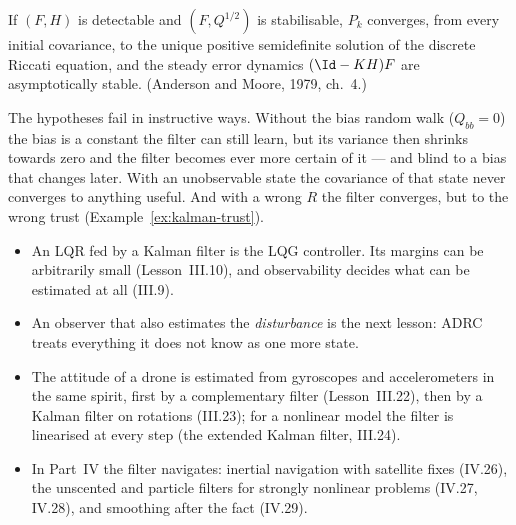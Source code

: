 \begin{theorem}
\label{thm:kalman-steady}
If $(F, H)$ is detectable and $(F, Q^{1/2})$ is stabilisable, $P_k$ converges, from every initial covariance, to the unique positive semidefinite solution of the discrete Riccati equation, and the steady error dynamics $(\Id - KH)F$ are asymptotically stable. (Anderson and Moore, 1979, ch.~4.)
\end{theorem}

The hypotheses fail in instructive ways. Without the bias random walk ($Q_{bb} = 0$) the bias is a constant the filter can still learn, but its variance then shrinks towards zero and the filter becomes ever more certain of it — and blind to a bias that changes later. With an unobservable state the covariance of that state never converges to anything useful. And with a wrong $R$ the filter converges, but to the wrong trust (Example~\ref{ex:kalman-trust}).

\begin{lookahead}
\begin{itemize}[leftmargin=1.2em]
  \item An LQR fed by a Kalman filter is the LQG controller. Its margins can be arbitrarily small (Lesson~III.10), and observability decides what can be estimated at all (III.9).
  \item An observer that also estimates the \emph{disturbance} is the next lesson: ADRC treats everything it does not know as one more state.
  \item The attitude of a drone is estimated from gyroscopes and accelerometers in the same spirit, first by a complementary filter (Lesson~III.22), then by a Kalman filter on rotations (III.23); for a nonlinear model the filter is linearised at every step (the extended Kalman filter, III.24).
  \item In Part~IV the filter navigates: inertial navigation with satellite fixes (IV.26), the unscented and particle filters for strongly nonlinear problems (IV.27, IV.28), and smoothing after the fact (IV.29).
\end{itemize}
\end{lookahead}

